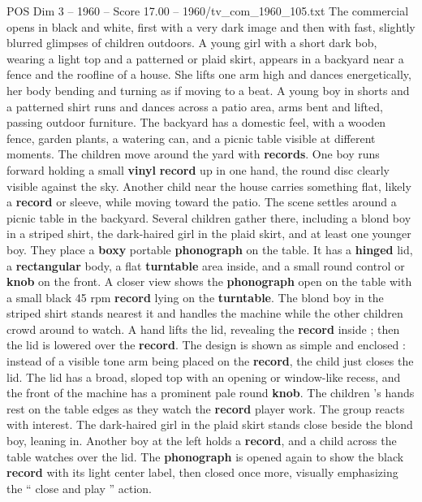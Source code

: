 \begin{textsample}{POS Dim 3 – 1960 – Score 17.00 – 1960/tv\_com\_1960\_105.txt}  \label{ex:f3_pos_026}
The commercial opens in black and white, first with a very dark image and then with fast, slightly blurred glimpses of children outdoors.
A young girl with a short dark bob, wearing a light top and a patterned or plaid skirt, appears in a backyard near a fence and the roofline of a house.
She lifts one arm high and dances energetically, her body bending and turning as if moving to a beat.
A young boy in shorts and a patterned shirt runs and dances across a patio area, arms bent and lifted, passing outdoor furniture.
The backyard has a domestic feel, with a wooden fence, garden plants, a watering can, and a picnic table visible at different moments.
The children move around the yard with \textbf{records}.
One boy runs forward holding a small \textbf{vinyl} \textbf{record} up in one hand, the round disc clearly visible against the sky.
Another child near the house carries something flat, likely a \textbf{record} or sleeve, while moving toward the patio.
The scene settles around a picnic table in the backyard.
Several children gather there, including a blond boy in a striped shirt, the dark-haired girl in the plaid skirt, and at least one younger boy.
They place a \textbf{boxy} portable \textbf{phonograph} on the table.
It has a \textbf{hinged} lid, a \textbf{rectangular} body, a flat \textbf{turntable} area inside, and a small round control or \textbf{knob} on the front.
A closer view shows the \textbf{phonograph} open on the table with a small black 45 rpm \textbf{record} lying on the \textbf{turntable}.
The blond boy in the striped shirt stands nearest it and handles the machine while the other children crowd around to watch.
A hand lifts the lid, revealing the \textbf{record} inside ; then the lid is lowered over the \textbf{record}.
The design is shown as simple and enclosed : instead of a visible tone arm being placed on the \textbf{record}, the child just closes the lid.
The lid has a broad, sloped top with an opening or window-like recess, and the front of the machine has a prominent pale round \textbf{knob}.
The children ’s hands rest on the table edges as they watch the \textbf{record} player work.
The group reacts with interest.
The dark-haired girl in the plaid skirt stands close beside the blond boy, leaning in.
Another boy at the left holds a \textbf{record}, and a child across the table watches over the lid.
The \textbf{phonograph} is opened again to show the black \textbf{record} with its light center label, then closed once more, visually emphasizing the “ close and play ” action.

\end{textsample}
